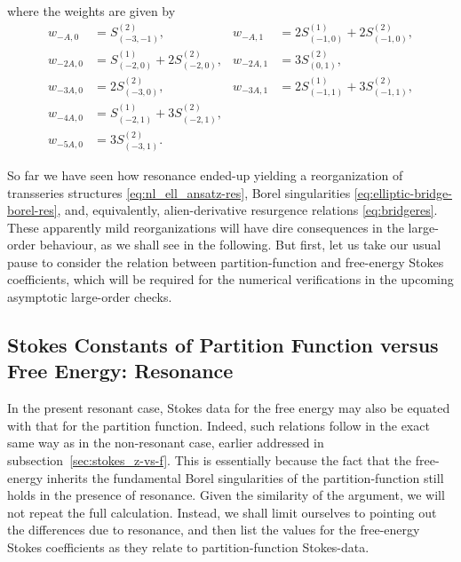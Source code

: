 \documentclass[11pt,a4paper]{article}
\begin{document}
%
\noindent
where the weights are given by
%
\begin{align}
w_{-A,0} &= S^{(2)}_{(-3,-1)}, &w_{-A,1} &= 2 S_{(-1,0)}^{(1)} + 2S_{(-1,0)}^{(2)}, \\
w_{-2A,0} &= S^{(1)}_{(-2,0)} + 2 S^{(2)}_{(-2,0)}, &w_{-2A,1} &= 3 S^{(2)}_{(0,1)}, \\
w_{-3A,0} &= 2 S^{(2)}_{(-3,0)}, &w_{-3A,1} &= 2 S^{(1)}_{(-1,1)} + 3 S^{(2)}_{(-1,1)}, \\
w_{-4A,0} &= S^{(1)}_{(-2,1)} + 3 S^{(2)}_{(-2,1)}, \\
w_{-5A,0} &= 3 S^{(2)}_{(-3,1)}.
\end{align}

So far we have seen how resonance ended-up yielding a reorganization of transseries structures \eqref{eq:nl_ell_ansatz-res}, Borel singularities \eqref{eq:elliptic-bridge-borel-res}, and, equivalently, alien-derivative resurgence relations \eqref{eq:bridgeres}. These apparently mild reorganizations will have dire consequences in the large-order behaviour, as we shall see in the following. But first, let us take our usual pause to consider the relation between partition-function and free-energy Stokes coefficients, which will be required for the numerical verifications in the upcoming asymptotic large-order checks.

\subsection{Stokes Constants of Partition Function versus Free Energy: Resonance}

In the present resonant case, Stokes data for the free energy may also be equated with that for the partition function. Indeed, such relations follow in the exact same way as in the non-resonant case, earlier addressed in subsection~\ref{sec:stokes_z-vs-f}. This is essentially because the fact that the free-energy inherits the fundamental Borel singularities of the partition-function still holds in the presence of resonance. Given the similarity of the argument, we will not repeat the full calculation. Instead, we shall limit ourselves to pointing out the differences due to resonance, and then list the values for the free-energy Stokes coefficients as they relate to partition-function Stokes-data.
\end{document}
